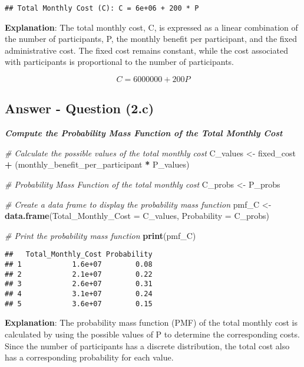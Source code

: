 \documentclass[
  11pt,
]{article}
\newenvironment{Shaded}{\begin{snugshade}}{\end{snugshade}}
\newcommand{\AttributeTok}[1]{\textcolor[rgb]{0.13,0.29,0.53}{#1}}
\newcommand{\CommentTok}[1]{\textcolor[rgb]{0.56,0.35,0.01}{\textit{#1}}}
\newcommand{\FunctionTok}[1]{\textcolor[rgb]{0.13,0.29,0.53}{\textbf{#1}}}
\newcommand{\NormalTok}[1]{#1}
\newcommand{\OtherTok}[1]{\textcolor[rgb]{0.56,0.35,0.01}{#1}}
\newcommand{\SpecialCharTok}[1]{\textcolor[rgb]{0.81,0.36,0.00}{\textbf{#1}}}
\begin{document}
\begin{verbatim}
## Total Monthly Cost (C): C = 6e+06 + 200 * P
\end{verbatim}

\textbf{Explanation}: The total monthly cost, C, is expressed as a
linear combination of the number of participants, P, the monthly benefit
per participant, and the fixed administrative cost. The fixed cost
remains constant, while the cost associated with participants is
proportional to the number of participants.

\[ C = 6000000 + 200 P\]

\subsection{Answer - Question (2.c)}\label{answer---question-2.c}

\textbf{\emph{Compute the Probability Mass Function of the Total Monthly
Cost}}

\begin{Shaded}
\begin{Highlighting}[]
\CommentTok{\# Calculate the possible values of the total monthly cost}
\NormalTok{C\_values }\OtherTok{\textless{}{-}}\NormalTok{ fixed\_cost }\SpecialCharTok{+}\NormalTok{ (monthly\_benefit\_per\_participant }\SpecialCharTok{*}\NormalTok{ P\_values)}

\CommentTok{\# Probability Mass Function of the total monthly cost}
\NormalTok{C\_probs }\OtherTok{\textless{}{-}}\NormalTok{ P\_probs}

\CommentTok{\# Create a data frame to display the probability mass function}
\NormalTok{pmf\_C }\OtherTok{\textless{}{-}} \FunctionTok{data.frame}\NormalTok{(}\AttributeTok{Total\_Monthly\_Cost =}\NormalTok{ C\_values, }\AttributeTok{Probability =}\NormalTok{ C\_probs)}

\CommentTok{\# Print the probability mass function}
\FunctionTok{print}\NormalTok{(pmf\_C)}
\end{Highlighting}
\end{Shaded}

\begin{verbatim}
##   Total_Monthly_Cost Probability
## 1            1.6e+07        0.08
## 2            2.1e+07        0.22
## 3            2.6e+07        0.31
## 4            3.1e+07        0.24
## 5            3.6e+07        0.15
\end{verbatim}

\textbf{Explanation}: The probability mass function (PMF) of the total
monthly cost is calculated by using the possible values of P to
determine the corresponding costs. Since the number of participants has
a discrete distribution, the total cost also has a corresponding
probability for each value.
\end{document}
